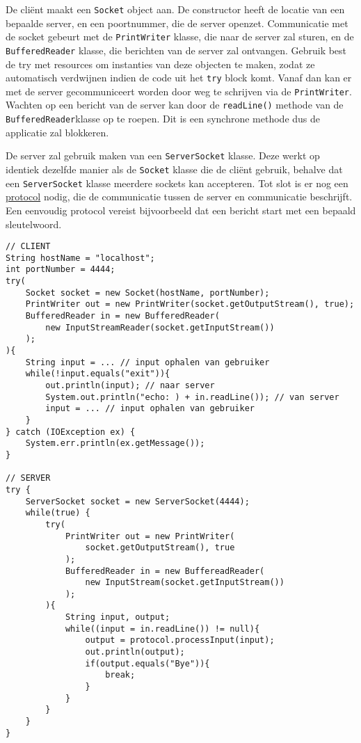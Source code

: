 \documentclass{report}
\begin{document}
De cliënt maakt een \texttt{Socket} object aan. De constructor heeft de locatie van een bepaalde server, en een poortnummer, die de server openzet. Communicatie met de socket gebeurt met de \texttt{PrintWriter} klasse, die naar de server zal sturen, en de \texttt{BufferedReader} klasse, die berichten van de server zal ontvangen. Gebruik best de try met resources om instanties van deze objecten te maken, zodat ze automatisch verdwijnen indien de code uit het \texttt{try} block komt. Vanaf dan kan er met de server gecommuniceert worden door weg te schrijven via de \texttt{PrintWriter}. Wachten op een bericht van de server kan door de \texttt{readLine()} methode van de \texttt{BufferedReader}klasse op te roepen. Dit is een synchrone methode dus de applicatie zal blokkeren. 

De server zal gebruik maken van een \texttt{ServerSocket} klasse. Deze werkt op identiek dezelfde manier als de \texttt{Socket} klasse die de cliënt gebruik, behalve dat een \texttt{ServerSocket} klasse meerdere sockets kan accepteren. Tot slot is er nog een \underline{protocol} nodig, die de communicatie tussen de server en communicatie beschrijft. Een eenvoudig protocol vereist bijvoorbeeld dat een bericht start met een bepaald sleutelwoord.

\begin{lstlisting}
// CLIENT
String hostName = "localhost";
int portNumber = 4444;
try(
    Socket socket = new Socket(hostName, portNumber);
    PrintWriter out = new PrintWriter(socket.getOutputStream(), true);
    BufferedReader in = new BufferedReader(
        new InputStreamReader(socket.getInputStream())
    );
){
    String input = ... // input ophalen van gebruiker
    while(!input.equals("exit")){
        out.println(input); // naar server
        System.out.println("echo: ) + in.readLine()); // van server
        input = ... // input ophalen van gebruiker
    }
} catch (IOException ex) {
    System.err.println(ex.getMessage());
}

// SERVER
try {
    ServerSocket socket = new ServerSocket(4444);
    while(true) {
        try(
            PrintWriter out = new PrintWriter(
                socket.getOutputStream(), true
            );
            BufferedReader in = new BuffereadReader(
                new InputStream(socket.getInputStream())
            );
        ){
            String input, output;
            while((input = in.readLine()) != null){
                output = protocol.processInput(input);
                out.println(output);
                if(output.equals("Bye")){
                    break;
                }
            }
        }
    }
}
\end{lstlisting}
\end{document}
